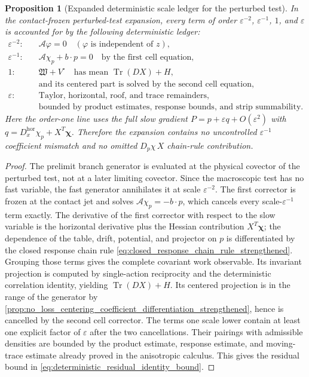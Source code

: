 \documentclass[12pt, letterpaper]{amsart}
\newcommand{\Acal}{\mathcal{A}}
\providecommand{\Tr}{\operatorname{Tr}}
\newcommand{\Hor}{\mathrm{hor}}
\theoremstyle{plain}
\newtheorem{proposition}[theorem]{Proposition}
\theoremstyle{definition}
\theoremstyle{remark}
\begin{document}
\begin{proposition}[Expanded deterministic scale ledger for the perturbed test]
\label{prop:expanded_scale_ledger_strengthened}
In the contact-frozen perturbed-test expansion, every term of order
$\varepsilon^{-2}$, $\varepsilon^{-1}$, $1$, and $\varepsilon$ is accounted for
by the following deterministic ledger:
\begin{equation}
\label{eq:expanded_scale_ledger_strengthened}
\begin{aligned}
\varepsilon^{-2}:&\quad
   \Acal\varphi=0
   \quad(\varphi\text{ is independent of }z),\\
\varepsilon^{-1}:&\quad
   \Acal\chi_p+b\cdot p=0
   \quad\text{by the first cell equation},\\
1:&\quad
   \mathfrak W+V^\circ
   \quad\text{has mean }\Tr(DX)+H,\\
&\quad
   \text{and its centered part is solved by the second cell equation},\\
\varepsilon:&\quad
   \text{Taylor, horizontal, roof, and trace remainders},\\
&\quad
   \text{bounded by product estimates, response bounds, and strip summability.}
\end{aligned}
\end{equation}
Here the order-one line uses the full slow gradient
$P=p+\varepsilon q+O(\varepsilon^2)$ with
$q=D_x^{\Hor}\chi_p+X^T\boldsymbol\chi$.  Therefore the expansion contains no
uncontrolled $\varepsilon^{-1}$ coefficient mismatch and no omitted
$D_p\chi\,X$ chain-rule contribution.
\end{proposition}

\begin{proof}
The prelimit branch generator is evaluated at the physical covector of the
perturbed test, not at a later limiting covector.  Since the macroscopic test
has no fast variable, the fast generator annihilates it at scale
$\varepsilon^{-2}$.  The first corrector is frozen at the contact jet and solves
$\Acal\chi_p=-b\cdot p$, which cancels every scale-$\varepsilon^{-1}$ term
exactly.  The derivative of the first corrector with respect to the slow
variable is the horizontal derivative plus the Hessian contribution
$X^T\boldsymbol\chi$; the dependence of the table, drift, potential, and
projector on $p$ is differentiated by the closed response chain rule
\eqref{eq:closed_response_chain_rule_strengthened}.  Grouping those terms gives
the complete covariant work observable.  Its invariant projection is computed by
single-action reciprocity and the deterministic correlation identity, yielding
$\Tr(DX)+H$.  Its centered projection is in the range of the generator by
\cref{prop:no_loss_centering_coefficient_differentiation_strengthened}, hence is
cancelled by the second cell corrector.  The terms one scale lower contain at
least one explicit factor of $\varepsilon$ after the two cancellations.  Their
pairings with admissible densities are bounded by the product estimate,
response estimate, and moving-trace estimate already proved in the anisotropic
calculus.  This gives the residual bound in
\eqref{eq:deterministic_residual_identity_bound}.
\end{proof}
\end{document}
